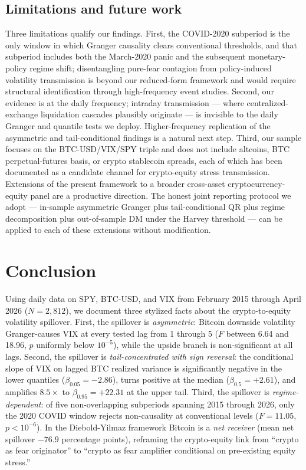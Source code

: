 \documentclass[11pt,a4paper]{article}
\begin{document}
\subsection{Limitations and future work}
\label{subsec:d_limits}

Three limitations qualify our findings. First, the COVID-2020 subperiod is the only window in which Granger causality clears conventional thresholds, and that subperiod includes both the March-2020 panic and the subsequent monetary-policy regime shift; disentangling pure-fear contagion from policy-induced volatility transmission is beyond our reduced-form framework and would require structural identification through high-frequency event studies. Second, our evidence is at the daily frequency; intraday transmission --- where centralized-exchange liquidation cascades plausibly originate --- is invisible to the daily Granger and quantile tests we deploy. Higher-frequency replication of the asymmetric and tail-conditional findings is a natural next step. Third, our sample focuses on the BTC-USD/VIX/SPY triple and does not include altcoins, BTC perpetual-futures basis, or crypto stablecoin spreads, each of which has been documented as a candidate channel for crypto-equity stress transmission. Extensions of the present framework to a broader cross-asset cryptocurrency-equity panel are a productive direction. The honest joint reporting protocol we adopt --- in-sample asymmetric Granger plus tail-conditional QR plus regime decomposition plus out-of-sample DM under the Harvey threshold --- can be applied to each of these extensions without modification.

\section{Conclusion}
\label{sec:conclusion}

Using daily data on SPY, BTC-USD, and VIX from February 2015 through April 2026 ($N = 2{,}812$), we document three stylized facts about the crypto-to-equity volatility spillover. First, the spillover is \emph{asymmetric}: Bitcoin downside volatility Granger-causes VIX at every tested lag from 1 through 5 ($F$ between 6.64 and 18.96, $p$ uniformly below $10^{-5}$), while the upside branch is non-significant at all lags. Second, the spillover is \emph{tail-concentrated with sign reversal}: the conditional slope of VIX on lagged BTC realized variance is significantly negative in the lower quantiles ($\beta_{0.05} = -2.86$), turns positive at the median ($\beta_{0.5} = +2.61$), and amplifies $8.5\times$ to $\beta_{0.95} = +22.31$ at the upper tail. Third, the spillover is \emph{regime-dependent}: of five non-overlapping subperiods spanning 2015 through 2026, only the 2020 COVID window rejects non-causality at conventional levels ($F = 11.05$, $p < 10^{-6}$). In the Diebold-Yilmaz framework Bitcoin is a \emph{net receiver} (mean net spillover $-76.9$ percentage points), reframing the crypto-equity link from ``crypto as fear originator'' to ``crypto as fear amplifier conditional on pre-existing equity stress.''
\end{document}
